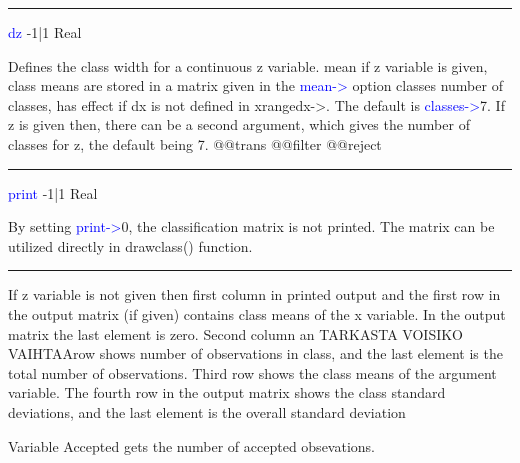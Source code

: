 \vspace{0.3cm}
\hrule
\vspace{0.3cm}
\noindent \textcolor{blue}{dz}  \tabto{3cm} -1|1 \tabto{5cm}  Real \tabto{7cm}
\begin{changemargin}{3cm}{0cm}
\noindent  Defines the class width for a continuous z variable.
mean if z variable is given, class means are stored in a matrix given in the \textcolor{blue}{mean->}
option
classes number of classes, has effect if dx is not defined in xrangedx->. The default is
\textcolor{blue}{classes->}7. If z is given then, there can be a second argument, which gives the
number of classes for z, the default being 7.
@@trans
@@filter
@@reject

\end{changemargin}
\vspace{0.3cm}
\hrule
\vspace{0.3cm}
\noindent \textcolor{blue}{print} \tabto{3cm} -1|1 \tabto{5cm}  Real \tabto{7cm}
\begin{changemargin}{3cm}{0cm}
\noindent  By setting \textcolor{blue}{print->}0, the classification matrix is not printed.
The matrix can be utilized directly in \textcolor{VioletRed}{drawclass}() function.
\end {changemargin}
\hrule
\vspace{0.2cm}
\begin{note}
If z variable is not given then first column in printed output and the first row in the output
matrix (if given) contains class means of the x variable. In the output matrix the last element is
zero. Second column an TARKASTA VOISIKO VAIHTAArow shows number of observations in
class, and the last element is the total number of observations. Third row shows the class means
of the argument variable. The fourth row in the output matrix shows the class standard
deviations, and the last element is the overall standard deviation
\end{note}
\begin{note}
Variable Accepted gets the number of accepted obsevations.
\end{note}
